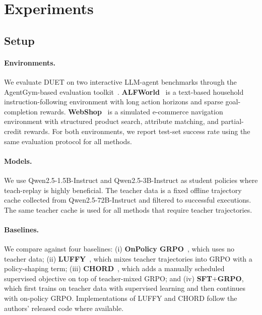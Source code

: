 
\section{Experiments}
\label{sec:experiments}

\subsection{Setup}
\label{sec:setup_exp}

\paragraph{Environments.}
We evaluate DUET on two interactive LLM-agent benchmarks through the AgentGym-based evaluation toolkit~\citep{xi2024agentgym}.
\textbf{ALFWorld}~\citep{shridhar2020alfworld} is a text-based household instruction-following environment with long action horizons and sparse goal-completion rewards.
\textbf{WebShop}~\citep{yao2022webshop} is a simulated e-commerce navigation environment with structured product search, attribute matching, and partial-credit rewards.
For both environments, we report test-set success rate using the same evaluation protocol for all methods.

\paragraph{Models.}
We use Qwen2.5-1.5B-Instruct and Qwen2.5-3B-Instruct as student policies where teach-replay is highly beneficial.
The teacher data is a fixed offline trajectory cache collected from Qwen2.5-72B-Instruct and filtered to successful executions.
The same teacher cache is used for all methods that require teacher trajectories.

\paragraph{Baselines.}
We compare against four baselines:
(i) \textbf{OnPolicy GRPO}~\citep{shao2024deepseekmath}, which uses no teacher data;
(ii) \textbf{LUFFY}~\citep{yan2025luffy}, which mixes teacher trajectories into GRPO with a policy-shaping term;
(iii) \textbf{CHORD}~\citep{zhang2025chord}, which adds a manually scheduled supervised objective on top of teacher-mixed GRPO; and
(iv) \textbf{SFT$+$GRPO}, which first trains on teacher data with supervised learning and then continues with on-policy GRPO.
Implementations of LUFFY and CHORD follow the authors' released code where available.

